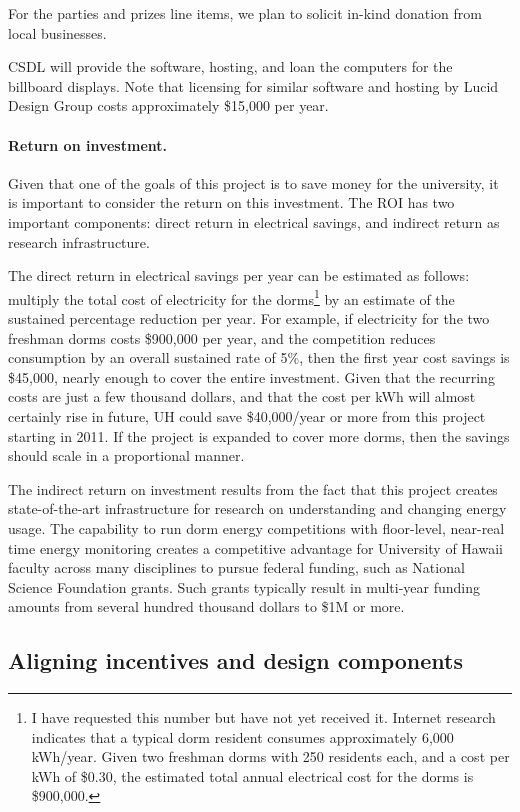\documentclass[11pt]{article}
\begin{document}
For the parties and prizes line items, we plan to solicit in-kind donation from
local businesses.

CSDL will provide the software, hosting, and loan the computers for the
billboard displays.  Note that licensing for similar software and hosting by
Lucid Design Group costs approximately \$15,000 per year.

\paragraph{Return on investment.}  Given that one of the goals of this
project is to save money for the university, it is important to consider
the return on this investment.  The ROI has two important components:
direct return in electrical savings, and indirect return as research
infrastructure.

The direct return in electrical savings per year can be estimated as
follows: multiply the total cost of electricity for the dorms\footnote{I
  have requested this number but have not yet received it. Internet
  research indicates that a typical dorm resident consumes approximately
  6,000 kWh/year. Given two freshman dorms with 250 residents each, and a
  cost per kWh of \$0.30, the estimated total annual electrical cost for the dorms
  is \$900,000.} by an estimate of the sustained percentage reduction per
year.  For example, if electricity for the two freshman dorms costs
\$900,000 per year, and the competition reduces consumption by an overall
sustained rate of 5\%, then the first year cost savings is \$45,000, nearly
enough to cover the entire investment.  Given that the recurring costs are
just a few thousand dollars, and that the cost per kWh will almost
certainly rise in future, UH could save \$40,000/year or more from this
project starting in 2011.  If the project is expanded to cover more dorms,
then the savings should scale in a proportional manner.

The indirect return on investment results from the fact that this project
creates state-of-the-art infrastructure for research on understanding and
changing energy usage.  The capability to run dorm energy competitions with
floor-level, near-real time energy monitoring creates a competitive
advantage for University of Hawaii faculty across many disciplines to
pursue federal funding, such as National Science Foundation grants.  Such
grants typically result in multi-year funding amounts from several hundred
thousand dollars to \$1M or more.


\subsection{Aligning incentives and design components}
\end{document}
